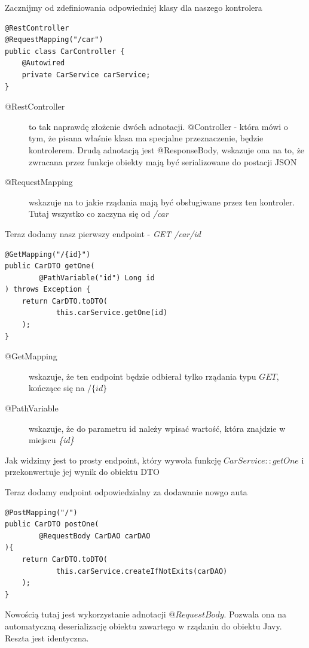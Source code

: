 \documentclass{article}
\begin{document}
                Zacznijmy od zdefiniowania odpowiedniej klasy dla naszego kontrolera
                \begin{verbatim}
@RestController
@RequestMapping("/car")
public class CarController { 
    @Autowired
    private CarService carService;
}
                \end{verbatim}
                \begin{description}
                    \item[@RestController] to tak naprawdę złożenie dwóch adnotacji. @Controller - która mówi o tym, że pisana właśnie klasa ma specjalne przeznaczenie, będzie kontrolerem. Drudą adnotacją jest @ResponseBody, wskazuje ona na to, że zwracana przez funkcje obiekty mają być serializowane do postacji JSON
                    \item[@RequestMapping] wskazuje na to jakie rządania mają być obsługiwane przez ten kontroler. Tutaj wszystko co zaczyna się od \emph{/car}
                \end{description}
                Teraz dodamy nasz pierwszy endpoint - \emph{GET /car/{id}}
                \begin{verbatim}
@GetMapping("/{id}")
public CarDTO getOne(
        @PathVariable("id") Long id
) throws Exception {
    return CarDTO.toDTO(
            this.carService.getOne(id)
    );
}                   
                \end{verbatim}
                \begin{description}
                    \item[@GetMapping] wskazuje, że ten endpoint będzie odbierał tylko rządania typu $GET$, kończące się na $/\{id\}$
                    \item[@PathVariable] wskazuje, że do parametru id należy wpisać wartość, która znajdzie w miejscu \emph{\{id\}}  
                \end{description}
                Jak widzimy jest to prosty endpoint, który wywoła funkcję $CarService::getOne$ i przekonwertuje jej wynik do obiektu DTO
                
                Teraz dodamy endpoint odpowiedzialny za dodawanie nowgo auta
                \begin{verbatim}
@PostMapping("/")
public CarDTO postOne(
        @RequestBody CarDAO carDAO
){
    return CarDTO.toDTO(
            this.carService.createIfNotExits(carDAO)
    );
}
                \end{verbatim}
                Nowością tutaj jest wykorzystanie adnotacji $@RequestBody$. Pozwala ona na automatyczną deserializację obiektu zawartego w rządaniu do obiektu Javy. Reszta jest identyczna.
\end{document}
